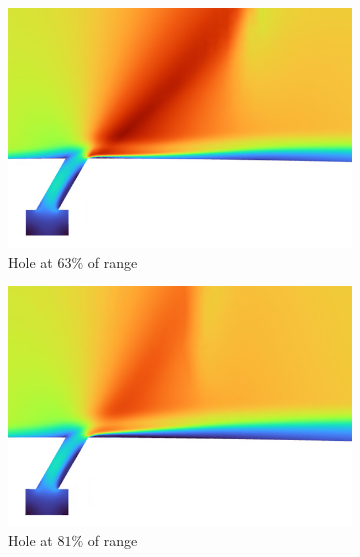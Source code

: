 \documentclass[a4paper, 11pt, oneside]{report}
\begin{document}
\begin{figure}[H]
	\centering
	\begin{subfigure}{.42\textwidth}
		\centering
		\includegraphics[width=\linewidth]{figs/sch_detail_mach_contours_4.png}
		\caption{Hole at $63\%$ of range}
		\vspace{0.018\textheight}
	\end{subfigure}
	\hspace{0.05\textwidth}
	\begin{subfigure}{.42\textwidth}
		\centering
		\includegraphics[width=\linewidth]{figs/sch_detail_mach_contours_5.png}
		\caption{Hole at $81\%$ of range}
		\vspace{0.018\textheight}
	\end{subfigure}
	\begin{subfigure}{.42\textwidth}
		\centering

\end{subfigure}
\end{figure}
\end{document}
